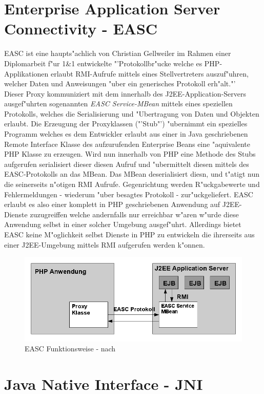 \section{Enterprise Application Server Connectivity - EASC}
\label{sec:background:easc}
EASC ist eine haupts"achlich von Christian Gellweiler im Rahmen einer Diplomarbeit f"ur 1\&1 entwickelte 
"'Protokollbr"ucke welche es PHP-Applikationen erlaubt RMI-Aufrufe mittels eines Stellvertreters auszuf"uhren, welcher
Daten und Anweisungen "uber ein generisches Protokoll erh"alt."' \cite{EASC}\\
Dieser Proxy kommuniziert mit dem innerhalb des J2EE-Application-Servers ausgef"uhrten sogenannten \emph{EASC Service-MBean} mittels
eines speziellen Protokolls, welches die Serialisierung und "Ubertragung von Daten und Objekten erlaubt.
Die Erzeugung der Proxyklassen ("'Stub"') "ubernimmt ein spezielles Programm welches es dem Entwickler erlaubt aus einer in Java geschriebenen
Remote Interface Klasse des aufzurufenden Enterprise Beans eine "aquivalente PHP Klasse zu erzeugen.
Wird nun innerhalb von PHP eine Methode des Stubs aufgerufen serialisiert dieser diesen Aufruf und "ubermittelt diesen mittels des EASC-Protokolls
an das MBean. Das MBean deserialisiert diesn, und t"atigt nun die seinerseits n"otigen RMI Aufrufe.
Gegenrichtung werden R"uckgabewerte und Fehlermeldungen - wiederum "uber besagtes Protokoll - zur"uckgeliefert.
EASC erlaubt es also einer komplett in PHP geschriebenen Anwendung auf J2EE-Dienste zuzugreiffen welche andernfalls nur
erreichbar w"aren w"urde diese Anwendung selbst in einer solcher Umgebung ausgef"uhrt. Allerdings bietet EASC keine M"oglichkeit
selbst Dienste in PHP zu entwickeln die ihrerseits aus einer J2EE-Umgebung mittels RMI aufgerufen werden k"onnen.
\begin{figure}[h]
\includegraphics[width=\textwidth]{intro/img/easc.png}
\caption{EASC Funktionsweise - nach \cite{EASC}}
\label{fig:easc}
\end{figure}

\section{Java Native Interface - JNI}
\label{sec:background:JNI}

